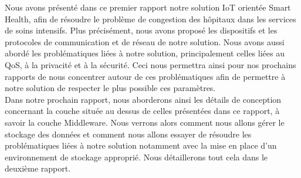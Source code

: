 Nous avons présenté dans ce premier rapport notre solution IoT orientée Smart Health, afin de résoudre le problème de congestion des hôpitaux dans les services de soins intensifs. Plus précisément, nous avons proposé les dispositifs et les protocoles de communication et de réseau de notre solution. Nous avons aussi abordé les problématiques liées à notre solution, principalement celles liées au QoS, à la privacité et à la sécurité. Ceci nous permettra ainsi pour nos prochains rapports de nous concentrer autour de ces problématiques afin de permettre à notre solution de respecter le plus possible ces paramètres.
\\

Dans notre prochain rapport, nous aborderons ainsi les détails de conception concernant la couche située au dessus de celles présentées dans ce rapport, à savoir la couche Middleware. Nous verrons alors comment nous allons gérer le stockage des données et comment nous allons essayer de résoudre les problématiques liées à notre solution notamment avec la mise en place d’un environnement de stockage approprié. Nous détaillerons tout cela dans le deuxième rapport.
